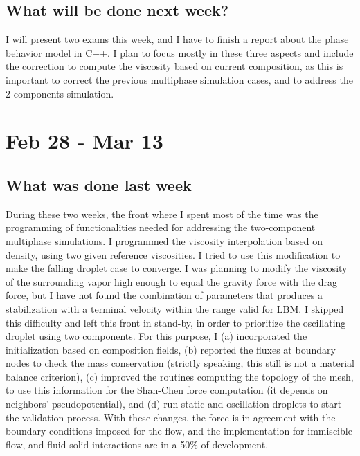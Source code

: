 \documentclass[12pt]{article}
\begin{document}
	
	\subsection*{What will be done next week?}
	I will present two exams this week, and I have to finish a report about the phase behavior model in C++. I plan to focus mostly in these three aspects and include the correction to compute the viscosity based on current composition, as this is important to correct the previous multiphase simulation cases, and to address the 2-components simulation.

	
	\pagebreak
	\section*{Feb 28 - Mar 13}
	\subsection*{What was done last week}
	During these two weeks, the front where I spent most of the time was the programming of functionalities needed for addressing the two-component multiphase simulations. I programmed the viscosity interpolation based on density, using two given reference viscosities. I tried to use this modification to make the falling droplet case to converge. I was planning to modify the viscosity of the surrounding vapor high enough to equal the gravity force with the drag force, but I have not found the combination of parameters that produces a stabilization with a terminal velocity within the range  valid for LBM. I skipped this difficulty and left this front in stand-by, in order to prioritize the oscillating droplet using two components. For this purpose, I (a) incorporated the initialization based on composition fields, (b) reported the fluxes at boundary nodes to check the mass conservation (strictly speaking, this still is not a material balance criterion), (c) improved the routines computing the topology of the mesh, to use this information for the Shan-Chen force computation (it depends on neighbors' pseudopotential), and (d) run static and oscillation droplets to start the validation process. With these changes, the force is in agreement with the boundary conditions imposed for the flow, and the implementation for immiscible flow, and fluid-solid interactions are in a 50\% of development.
	
\end{document}
